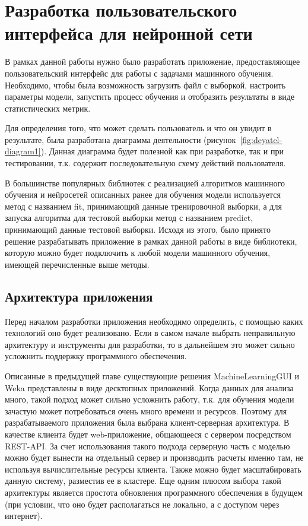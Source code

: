 \chapter{Разработка пользовательского интерфейса для нейронной сети}
В рамках данной работы нужно было разработать приложение, предоставляющее пользовательский интерфейс для работы с задачами машинного обучения. Необходимо, чтобы была возможность загрузить файл с выборкой, настроить параметры модели, запустить процесс обучения и отобразить результаты в виде статистических метрик.


Для определения того, что может сделать пользователь и что он увидит в результате, была разработана диаграмма деятельности (рисунок~\ref{fig:deyatel-diagram1}). Данная диаграмма будет полезной как при разработке, так и при тестировании, т.к. содержит последовательную схему действий пользователя.




В большинстве популярных библиотек с реализацией алгоритмов машинного обучения и нейросетей описанных ранее для обучения модели используется метод с названием fit, принимающий данные тренировочной выборки, а для запуска алгоритма для тестовой выборки метод с названием predict, принимающий данные тестовой выборки. Исходя из этого, было принято решение разрабатывать приложение в рамках данной работы в виде библиотеки, которую можно будет подключить к любой модели машинного обучения, имеющей перечисленные выше методы.


\section{Архитектура приложения}
Перед началом разработки приложения необходимо определить, с помощью каких технологий оно будет реализовано. Если в самом начале выбрать неправильную архитектуру и инструменты для разработки, то в дальнейшем это может сильно усложнить поддержку программного обеспечения.


Описанные в предыдущей главе существующие решения MachineLearningGUI и Weka представлены в виде десктопных приложений. Когда данных для анализа много, такой подход может сильно усложнить работу, т.к. для обучения модели зачастую может потребоваться очень много времени и ресурсов. Поэтому для разрабатываемого приложения была выбрана клиент-серверная архитектура. В качестве клиента будет web-приложение, общающееся с сервером посредством REST-API. За счет использования такого подхода серверную часть с моделью можно будет вынести на отдельный сервер и производить расчеты именно там, не используя вычислительные ресурсы клиента. Также можно будет масштабировать данную систему, разместив ее в кластере. Еще одним плюсом выбора такой архитектуры является простота обновления программного обеспечения в будущем (при условии, что оно будет располагаться не локально, а с доступом через интернет).


